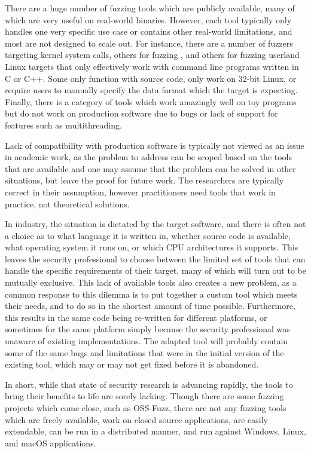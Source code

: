 There are a huge number of fuzzing tools\cite{afl,aflosx,winafl,peach22,syzkaller,ossfuzz,driller,radamsa,ni,zzuf,synfuzz,brundlefuzz,honggfuzz,kafl,vuzzer,boofuzz} which are publicly available, many of
which are very useful on real-world binaries.
However, each tool
typically only handles one very specific use case or contains other real-world limitations, and most are not designed to scale
out.  For instance, there are a number of fuzzers targeting kernel system calls\cite{syzkaller,trinity,kafl,osxfuzz}, others for
fuzzing \IOCTLs{}\cite{ioctlfuzzer,ioctlbf}, and others for fuzzing userland Linux targets that only effectively work with
command line programs written in C or C++.  Some only function with
source code, only work on 32-bit Linux\cite{vuzzer}, or require users to manually specify
the data format which the target is
expecting.\cite{peach,boofuzz}  Finally, there is a category of tools which work amazingly well
on toy programs but do not work on production software due to bugs or lack of
support for features such as multithreading.\cite{grimmdriller,angrissues}

Lack of compatibility with production software is typically not viewed as an issue in academic work, as the problem to address can be
scoped based on the tools that are available and one may assume that the problem can
be solved in other situations, but leave the proof for future work.  The researchers
are typically correct in their assumption, however practitioners need tools
that work in practice, not theoretical solutions.

In industry, the situation is dictated by the target software,
and there is often not a choice as to what language it is
written in, whether source code is available, what operating system it runs
on, or which CPU architectures it supports. This leaves the security
professional to choose between the limited set of tools that can handle the specific requirements of their target, many of which will
turn out to be mutually exclusive. This lack of available tools also creates a new problem, as a common
response to this dilemma is to put together a custom tool which meets their
needs, and to do so in the shortest amount of time possible.  Furthermore,
this results in the same code being re-written for different platforms, or
sometimes for the same platform simply because the security professional was
unaware of existing implementations.  The adapted tool will probably
contain some of the same bugs and limitations that were in the initial
version of the existing tool, which may or may not get fixed before it is
abandoned.

In short, while that state of security research is advancing rapidly, the
tools to bring their benefits to life are sorely lacking.  Though there are some
fuzzing projects which come close, such as OSS-Fuzz,\cite{ossfuzz} there
are not any fuzzing tools which are freely available, work on closed source applications,
are easily extendable,
can be run in a distributed manner, and run against Windows, Linux, and macOS applications.
